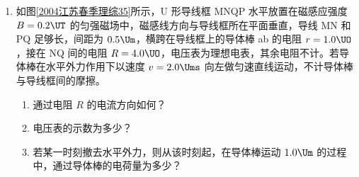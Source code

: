 \documentclass[\gkver]{gaokaozhenti}
\begin{document}
\begin{enumerate}
{\begin{enumerate}
	\item
	$F_{1}=1.5\times10^{4}\UN$

	\item
	$s'=9.0\times10^{2}\Um$

\end{enumerate}
}

\item
如图\ref{2004江苏春季理综35}所示，U 形导线框 MNQP 水平放置在磁感应强度 $B=0.2\UT$ 的匀强磁场中，磁感线方向与导线框所在平面垂直，导线 MN 和 PQ 足够长，间距为 $0.5\Um$，横跨在导线框上的导体棒 ab 的电阻 $r=1.0\UO$，接在 NQ 间的电阻 $R=4.0\UO$，电压表为理想电表，其余电阻不计。若导体棒在水平外力作用下以速度 $v=2.0\Ums$ 向左做匀速直线运动，不计导体棒与导线框间的摩擦。
\begin{enumerate}
	\item
	通过电阻 $R$ 的电流方向如何？
	\item
	电压表的示数为多少？
	\item
	若某一时刻撤去水平外力，则从该时刻起，在导体棒运动 $1.0\Um$ 的过程中，通过导体棒的电荷量为多少？
\end{enumerate}
\end{enumerate}
\end{document}
